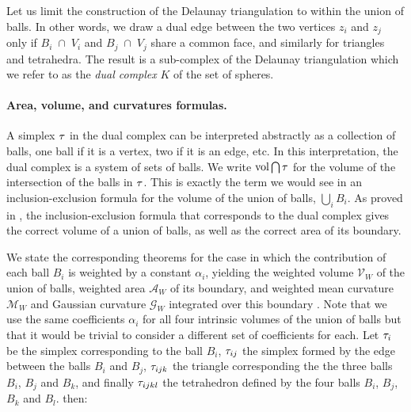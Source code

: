 \documentclass[11 pt]{article}
\newcommand {\mm}[1] {\ifmmode{#1}\else{\mbox{\(#1\)}}\fi}
\theoremstyle{plain} \theorembodyfont{\rmfamily}
\newcommand{\tsx}           {\mm{\tau}}
\newcommand{\capsp}         {{\; \cap \;}}
\newcommand{\Volume}[1]     {\mm{\rm vol\,}{#1}}
\begin{document}
Let us limit the construction of the Delaunay triangulation to within
the union of balls.
In other words, we draw a dual edge between the two vertices $z_i$ and $z_j$ only if
$B_i \capsp V_i$ and $B_j \capsp V_j$ share a common face,
and similarly for triangles and tetrahedra.
The result is a sub-complex of the Delaunay triangulation which we refer
to as the \emph{dual complex} $K$ of the set of spheres.


\paragraph{Area, volume, and curvatures formulas.}
A simplex $\tsx$ in the dual complex can be interpreted abstractly
as a collection of balls, one ball if it is a vertex, two if it is an edge, etc. 
In this interpretation, the dual complex is a system of sets of balls.
We write $\Volume{\bigcap \tsx}$ for the volume of the intersection of the balls in $\tsx$.
This is exactly the term we would see in an inclusion-exclusion formula
for the volume of the union of balls, $\bigcup_i B_i$.
As proved in \cite{NaWy92, Ede95}, the inclusion-exclusion formula that corresponds to the dual complex gives the correct volume of a union of balls, as well as the correct area of its boundary.

We state the corresponding theorems for the case in which the contribution of each ball $B_i$ is weighted by a constant $\alpha_i$, yielding the weighted volume $\mathcal{V}_W$ of the union of balls, weighted area $\mathcal{A}_W$ of its boundary, and weighted mean curvature $\mathcal{M}_W$  and Gaussian curvature $\mathcal{G}_W$  integrated over this boundary .  Note that we use the same coefficients $\alpha_i$ for all four intrinsic volumes of the union of balls but that it would be trivial to consider a different set of coefficients for each.
Let $\tsx_i$ be the simplex corresponding to the ball $B_i$, $\tsx_{ij}$ the simplex formed by the edge between the balls $B_i$ and $B_j$, $\tsx_{ijk}$ the triangle
corresponding the the three balls $B_i$, $B_j$ and $B_k$, and finally $\tsx_{ijkl}$ the tetrahedron
defined by the four balls $B_i$, $B_j$, $B_k$ and $B_l$. then:
\end{document}
